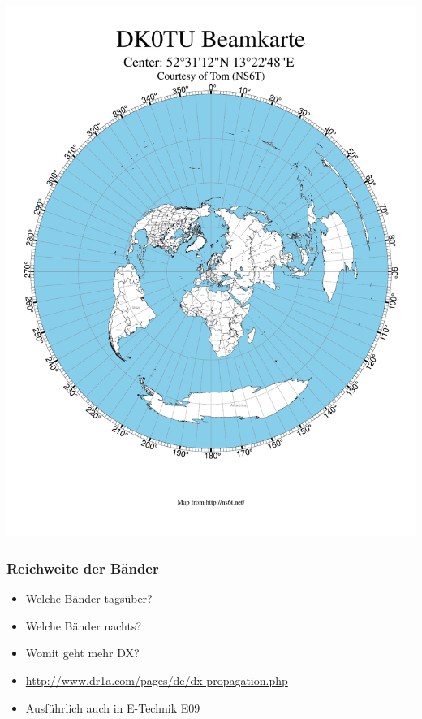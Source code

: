 \begin{frame}
  \begin{center}
    \includegraphics[height=\textheight,height=\textheight,keepaspectratio]{a08/AzimuthalMap.pdf}
  \end{center}
\end{frame}

\begin{frame}
  \frametitle{Reichweite der Bänder}
  \begin{center}
    \begin{itemize}
      \item Welche Bänder tagsüber?
      \item Welche Bänder nachts?
      \item Womit geht mehr DX?
      \item \url{http://www.dr1a.com/pages/de/dx-propagation.php}
      \item Ausführlich auch in E-Technik E09
    \end{itemize}
  \end{center}
\end{frame}

